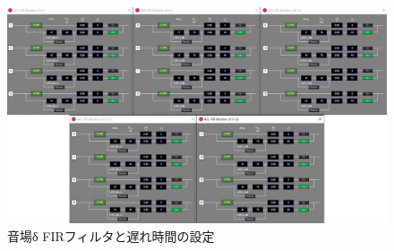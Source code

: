 \documentclass[11pt,a4j]{jreport}
\begin{document}
\begin{figure}[H]
  \centering
  \includegraphics[width=.8\linewidth]{images/experimentField/afcParameters/04delta/02FIR.jpg}
  \caption{音場δ FIRフィルタと遅れ時間の設定}
  \label{fig:deltaFIRフィルタの設定}
\end{figure}
\end{document}
